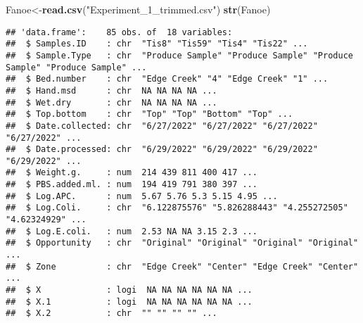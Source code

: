 \documentclass[
]{article}
\newenvironment{Shaded}{\begin{snugshade}}{\end{snugshade}}
\newcommand{\FunctionTok}[1]{\textcolor[rgb]{0.13,0.29,0.53}{\textbf{#1}}}
\newcommand{\NormalTok}[1]{#1}
\newcommand{\OtherTok}[1]{\textcolor[rgb]{0.56,0.35,0.01}{#1}}
\newcommand{\SpecialCharTok}[1]{\textcolor[rgb]{0.81,0.36,0.00}{\textbf{#1}}}
\newcommand{\StringTok}[1]{\textcolor[rgb]{0.31,0.60,0.02}{#1}}
\begin{document}
\begin{Shaded}
\begin{Highlighting}[]
\NormalTok{Fanoe}\OtherTok{\textless{}{-}}\FunctionTok{read.csv}\NormalTok{(}\StringTok{"Experiment\_1\_trimmed.csv"}\NormalTok{)}
\FunctionTok{str}\NormalTok{(Fanoe)}
\end{Highlighting}
\end{Shaded}

\begin{verbatim}
## 'data.frame':    85 obs. of  18 variables:
##  $ Samples.ID    : chr  "Tis8" "Tis59" "Tis4" "Tis22" ...
##  $ Sample.Type   : chr  "Produce Sample" "Produce Sample" "Produce Sample" "Produce Sample" ...
##  $ Bed.number    : chr  "Edge Creek" "4" "Edge Creek" "1" ...
##  $ Hand.msd      : chr  NA NA NA NA ...
##  $ Wet.dry       : chr  NA NA NA NA ...
##  $ Top.bottom    : chr  "Top" "Top" "Bottom" "Top" ...
##  $ Date.collected: chr  "6/27/2022" "6/27/2022" "6/27/2022" "6/27/2022" ...
##  $ Date.processed: chr  "6/29/2022" "6/29/2022" "6/29/2022" "6/29/2022" ...
##  $ Weight.g.     : num  214 439 811 400 417 ...
##  $ PBS.added.ml. : num  194 419 791 380 397 ...
##  $ Log.APC.      : num  5.67 5.76 5.3 5.15 4.95 ...
##  $ Log.Coli.     : chr  "6.122875576" "5.826288443" "4.255272505" "4.62324929" ...
##  $ Log.E.coli.   : num  2.53 NA NA 3.15 2.3 ...
##  $ Opportunity   : chr  "Original" "Original" "Original" "Original" ...
##  $ Zone          : chr  "Edge Creek" "Center" "Edge Creek" "Center" ...
##  $ X             : logi  NA NA NA NA NA NA ...
##  $ X.1           : logi  NA NA NA NA NA NA ...
##  $ X.2           : chr  "" "" "" "" ...
\end{verbatim}

\begin{Shaded}
\end{Shaded}
\end{document}
